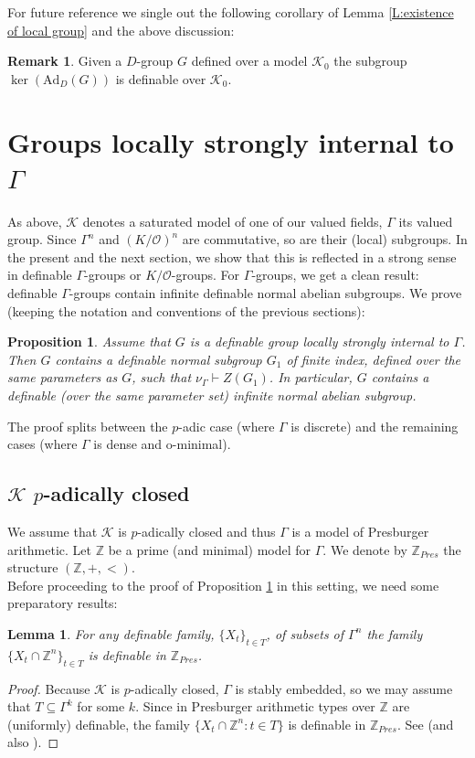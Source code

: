 \documentclass[11pt]{amsart}
\newtheorem{lemma}[theorem]{Lemma}
\newtheorem{proposition}[theorem]{Proposition}
\theoremstyle{definition}
\newtheorem{remark}[theorem]{Remark}
\newcommand{\Zz}{{\mathbb {Z}}}
\newcommand{\CK}{{\mathcal K}}
\newcommand{\CO}{{\mathcal O}}
\newcommand{\0}{\emptyset}
\newcommand{\ad}{\mathrm{Ad}}
\def\sub{\subseteq}
\begin{document}
For future reference we single out the following corollary of Lemma \ref{L:existence of local group} and the above discussion: 
\begin{remark}\label{R: H1H2 over the same parameters}
    Given a $D$-group $G$ defined over a model $\CK_0$ the subgroup $\ker(\ad_D(G))$ is definable over $\CK_0$. 
\end{remark}


\section{Groups locally strongly internal to  $\Gamma$}

As above, $\CK$ denotes a saturated model of one of our valued fields, $\Gamma$ its valued group. Since  $\Gamma^n$ and $(K/\CO)^n$ are commutative, so are their (local) subgroups. In the present and the next section, we show that this is reflected in a strong sense in definable $\Gamma$-groups or $K/\CO$-groups. For $\Gamma$-groups, we get a clean result:  definable $\Gamma$-groups contain infinite definable normal abelian subgroups. We prove (keeping the notation and conventions of the previous sections): 
\begin{proposition}\label{P: Gamma}
Assume that $G$ is a definable group  locally strongly internal to $\Gamma$. Then $G$ contains a  definable normal subgroup $G_1$ of finite index, defined over the same parameters as $G$, such that  $\nu_\Gamma\vdash Z(G_1)$. In particular, $G$ contains a definable (over the same parameter set) infinite normal abelian subgroup.
\end{proposition}

The proof splits between the $p$-adic case (where $\Gamma$ is discrete) and the remaining cases (where $\Gamma$ is dense and o-minimal). 

\subsection{$\CK$ $p$-adically closed}
We assume that $\CK$ is $p$-adically closed and thus $\Gamma$ is a model of Presburger arithmetic. Let $\mathbb{Z}$ be a prime (and minimal) model for $\Gamma$. We denote by $\mathbb{Z}_{Pres}$ the structure $(\mathbb{Z},+,<)$. \\

Before proceeding to the proof of  Proposition \ref{P: Gamma} in this setting, we need some preparatory results: 

\begin{lemma}\label{F: def over Z}
For any definable family, $\{X_t\}_{t\in T}$, of subsets of $\Gamma^n$ the family $\{X_t\cap \Zz^n\}_{t\in T}$  is  definable in $\Zz_{Pres}$.
\end{lemma}
\begin{proof}
Because $\CK$ is $p$-adically closed, $\Gamma$ is stably embedded, so we may assume that $T\sub \Gamma^k$ for some $k$. Since in  Presburger arithmetic types over $\mathbb{Z}$ are (uniformly) definable, the family $\{X_t\cap \Zz^n:t\in T\}$ is definable in $\Zz_{Pres}$. See  \cite[Theorem 0.7]{CoVo} (and also \cite{delon-def}).
\end{proof}
\end{document}
